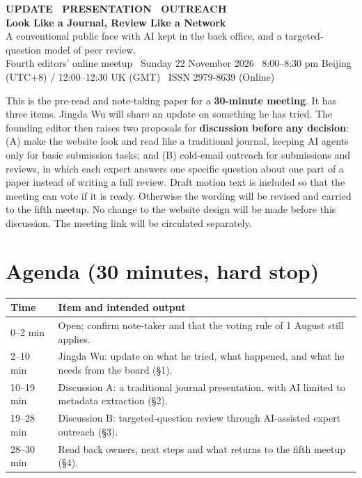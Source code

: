 \documentclass[11pt]{article}
\begin{document}
\begin{tcolorbox}[colback=darkbg,colframe=darkbg,arc=3pt,left=18pt,right=18pt,top=14pt,bottom=14pt]
  {\sffamily\footnotesize\color{accent}\bfseries UPDATE \textbullet\ PRESENTATION \textbullet\ OUTREACH}\\[4pt]
  {\sffamily\LARGE\bfseries\color{white} Look Like a Journal, Review Like a Network}\\[5pt]
  {\sffamily\small\color{white!75} A conventional public face with AI kept in the back office, and a targeted-question model of peer review.}\\[8pt]
  {\sffamily\footnotesize\color{white!60} Fourth editors' online meetup \textbullet\ Sunday 22 November 2026 \textbullet\ 8:00--8:30 pm Beijing (UTC+8) / 12:00--12:30 UK (GMT) \textbullet\ ISSN 2979-8639 (Online)}
\end{tcolorbox}

\vspace{4pt}
{\small\color{ink2}This is the pre-read and note-taking paper for a \textbf{30-minute meeting}. It has three items. Jingda Wu will share an update on something he has tried. The founding editor then raises two proposals for \textbf{discussion before any decision}: (A) make the website look and read like a traditional journal, keeping AI agents only for basic submission tasks; and (B) cold-email outreach for submissions and reviews, in which each expert answers one specific question about one part of a paper instead of writing a full review. Draft motion text is included so that the meeting can vote if it is ready. Otherwise the wording will be revised and carried to the fifth meetup. No change to the website design will be made before this discussion. The meeting link will be circulated separately.}

\section*{Agenda \textnormal{\footnotesize\color{ink3}(30 minutes, hard stop)}}
\renewcommand{\arraystretch}{1.14}
\begin{center}\small
\begin{tabular}{@{}p{1.95cm}p{12.15cm}@{}}
\toprule
\textbf{Time} & \textbf{Item and intended output} \\
\midrule
0--2 min & Open; confirm note-taker and that the voting rule of 1 August still applies. \\
2--10 min & Jingda Wu: update on what he tried, what happened, and what he needs from the board (\S1). \\
10--19 min & Discussion A: a traditional journal presentation, with AI limited to metadata extraction (\S2). \\
19--28 min & Discussion B: targeted-question review through AI-assisted expert outreach (\S3). \\
28--30 min & Read back owners, next steps and what returns to the fifth meetup (\S4). \\
\bottomrule
\end{tabular}
\end{center}
\end{document}
